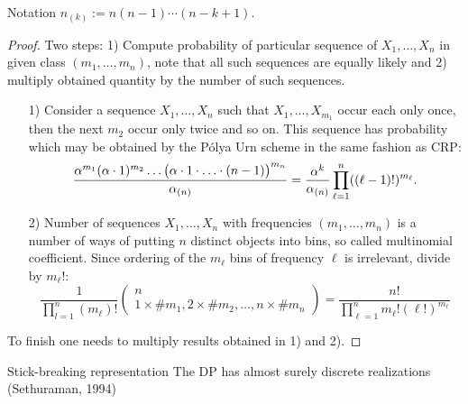 Notation $n_{(k)}:=n(n-1)\cdots(n-k+1)$.





\begin{proof}
Two steps: 1) Compute probability of particular sequence of $X_1, \ldots, X_n$ in given class $(m_1,\ldots,m_n)$, note that all such sequences are equally likely and 2) multiply obtained quantity by the number of such sequences. 

\begin{itemize}
    \item[1)] Consider a sequence $X_1,\ldots, X_n$ such that $X_1, \ldots, X_{m_1}$ occur each only once, then the next $m_2$ occur only twice and so on. This sequence has probability which may be obtained by the P\'olya Urn scheme in the same fashion as CRP:
    \begin{equation*}
        \frac{\alpha^{m_1} (\alpha \cdot 1)^{m_2} \ldots \big( \alpha \cdot 1 \cdot\ldots \cdot (n-1) \big)^{m_n}  }{\alpha_{(n)}}=\frac{\alpha^k}{\alpha_{(n)}}\prod_{\ell=1}^n ((\ell-1)!)^{m_\ell}.
    \end{equation*}
    \item[2)] Number of sequences $X_1,\ldots,X_n$ with frequencies $(m_1, \ldots, m_n)$ is a number of ways of putting $n$ distinct objects into bins, so called multinomial coefficient. Since ordering of the $m_\ell$ bins of frequency $\ell$ is irrelevant,  divide by $m_\ell!$:
    \begin{equation*}
        \frac{1}{\prod_{l=1}^n (m_\ell)!}
        \begin{pmatrix}
n\\ 
1\times \# m_1, 2\times \# m_2, \ldots, n\times \# m_n
\end{pmatrix}
= \frac{n!}{\prod_{\ell=1}^n m_\ell!(\ell!)^{m_\ell}}
    \end{equation*}
\end{itemize}
To finish one needs to multiply results obtained in 1) and 2). \end{proof}






{Stick-breaking representation}
The \alert{DP} has almost surely \alert{discrete} realizations (Sethuraman, 1994)

